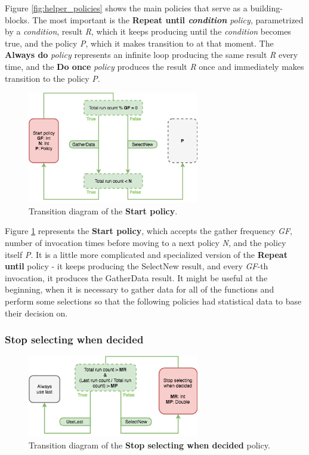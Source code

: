 Figure \ref{fig:helper_policies} shows the main policies that serve as a building-blocks. The most important is the \textbf{Repeat until \textit{condition}} \textit{policy}, parametrized by a \textit{condition}, result \textit{R}, which it keeps producing until the \textit{condition} becomes true, and the policy \textit{P}, which it makes transition to at that moment. The \textbf{Always do} \textit{policy} represents an infinite loop producing the same result \textit{R} every time, and the \textbf{Do once} \textit{policy} produces the result \textit{R} once and immediately makes transition to the policy \textit{P}.

\begin{figure}[h!]
	\centerline{\mbox{\includegraphics[width=75mm]{./img/start_policy.png}}}
	\caption{Transition diagram of the \textbf{Start policy}.}
	\label{fig:start_policy}
\end{figure}

Figure \ref{fig:start_policy} represents the \textbf{Start policy}, which accepts the gather frequency \textit{GF}, number of invocation times before moving to a next policy \textit{N}, and the policy itself \textit{P}. It is a little more complicated and specialized version of the \textbf{Repeat until} policy - it keeps producing the SelectNew result, and every \textit{GF}-th invocation, it produces the GatherData result. It might be useful at the beginning, when it is necessary to gather data for all of the functions and perform some selections so that the following policies had statistical data to base their decision on.

\subsubsection{Stop selecting when decided}

\begin{figure}[h!]
	\centerline{\mbox{\includegraphics[width=75mm]{./img/stop_selecting_when_decided.png}}}
	\caption{Transition diagram of the \textbf{Stop selecting  when decided} policy.}
	\label{fig:stop_selecting_when_decided}
\end{figure}

